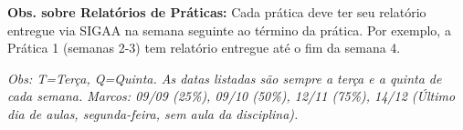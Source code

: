 \documentclass[11pt,a4paper]{article}
\begin{document}
\begin{center}
\begin{longtable}{|c|c|p{5.0cm}|p{4.0cm}|p{1.8cm}|}
\end{longtable}
\end{center}

\vspace{0.5em}

\textbf{Obs. sobre Relatórios de Práticas:} Cada prática deve ter seu relatório entregue via SIGAA na semana seguinte ao término da prática. Por exemplo, a Prática 1 (semanas 2-3) tem relatório entregue até o fim da semana 4.

\vspace{0.5em}

\textit{Obs: T=Terça, Q=Quinta. As datas listadas são sempre a terça e a quinta de cada semana. Marcos: 09/09 (25\%), 09/10 (50\%), 12/11 (75\%), 14/12 (Último dia de aulas, segunda-feira, sem aula da disciplina).}
\end{document}
